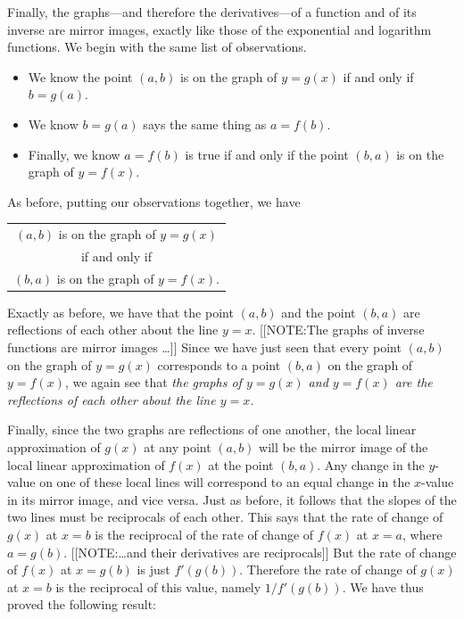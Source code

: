 \pagebreak

	Finally, the graphs---and therefore the derivatives---of a function and of its inverse are mirror images, exactly like those of the exponential and logarithm functions.  We begin with the same list of observations.
\begin{itemize}
\item  We know the point $(a, b)$ is on the graph of $y=g(x)$ if and only if
  $b = g(a)$.
\item  We know $b = g(a)$ says the same thing as $a = f(b)$.
\item  Finally, we know $a = f(b)$ is true if and only if the point $(b, a)$ is on the graph of $y = f(x)$.
\end{itemize}


As before, putting our observations together, we have
\begin{center}


\begin{tabular}{c}
$(a, b)$ is on the graph of $y=g(x)$ \\
if and only if \\
$(b, a)$ is on the graph of $y=f(x)$.
\end{tabular}

\end{center}

\noindent Exactly as before, we have that the point $(a, b)$ and the point $(b, a)$ are reflections of each other about the line $y=x$.  
	[[NOTE:The graphs of inverse functions are mirror images \ldots]]
Since we have just seen that every point  $(a, b)$ on the graph of $y=g(x)$ corresponds to a point $(b, a)$ on the graph of $y=f(x)$, we again see that {\em the 
graphs of $y=g(x)$ and $y=f(x)$ are the reflections of each other     about the line $y=x$.}


	Finally, since the two graphs are reflections of one another, the local linear 
approximation of $g(x)$  at any point $(a, b)$ will be the mirror image of 
the local linear approximation of $f(x)$ at the point $(b, a)$. 
Any change in the $y$-value on one of these local lines will correspond to an equal change 
in the $x$-value in its mirror image, and vice versa.  
Just as before, it follows that the slopes of the two lines must be reciprocals of each other.  This says that the rate of change of $g(x)$ at $x = b$ is the reciprocal of 
the rate of change of $f(x)$ at $x = a$, where $a = g(b)$.  
	[[NOTE:\ldots and their derivatives are reciprocals]]
But the rate of change of $f(x)$ at $x = g(b)$ is just $f'(g(b))$.  Therefore the rate of change of $g(x)$ at $x = b$ is the reciprocal of this value, namely $1/f'(g(b))$.  We have thus proved the 
following result:  



